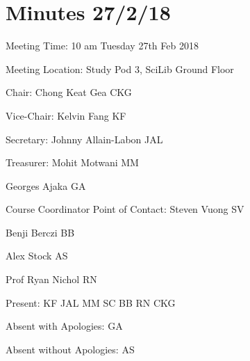 \section{Minutes 27/2/18} \label{app:27-2}

\noindent Meeting Time: 10 am Tuesday 27th Feb 2018

\noindent Meeting Location: Study Pod 3, SciLib Ground Floor



\noindent \textbf{}

\noindent Chair: Chong Keat Gea CKG

\noindent Vice-Chair: Kelvin Fang KF

\noindent Secretary: Johnny Allain-Labon JAL

\noindent Treasurer: Mohit Motwani MM

\noindent Georges Ajaka GA

\noindent Course Coordinator Point of Contact: Steven Vuong SV

\noindent Benji Berczi BB

\noindent Alex Stock AS

\noindent Prof Ryan Nichol RN

\noindent 

\noindent Present: KF JAL MM SC BB RN CKG

\noindent Absent with Apologies: GA

\noindent Absent without Apologies: AS




